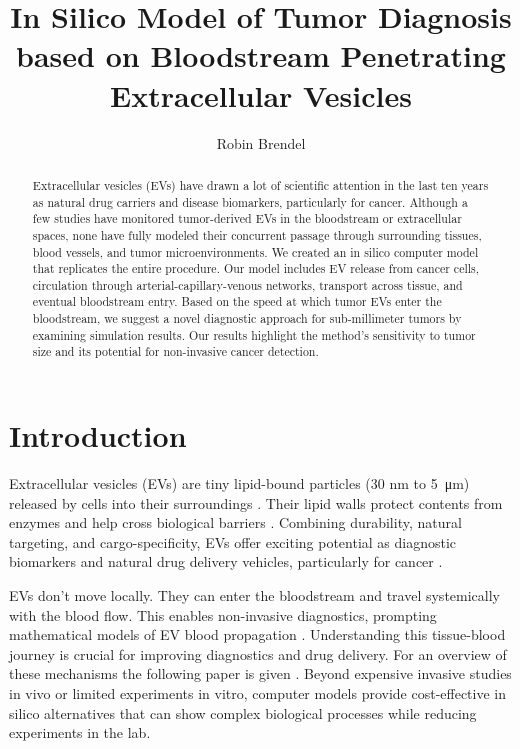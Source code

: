\documentclass[sigconf]{acmart}
\begin{document}
\title{In Silico Model of Tumor Diagnosis based on Bloodstream Penetrating Extracellular Vesicles}
\author{Robin Brendel}

\begin{abstract}
Extracellular vesicles (EVs) have drawn a lot of scientific attention in the last ten years as natural drug carriers and disease biomarkers, particularly for cancer. Although a few studies have monitored tumor-derived EVs in the bloodstream or extracellular spaces, none have fully modeled their concurrent passage through surrounding tissues, blood vessels, and tumor microenvironments. We created an in silico computer model that replicates the entire procedure. Our model includes EV release from cancer cells, circulation through arterial-capillary-venous networks, transport across tissue, and eventual bloodstream entry. Based on the speed at which tumor EVs enter the bloodstream, we suggest a novel diagnostic approach for sub-millimeter tumors by examining simulation results. Our results highlight the method's sensitivity to tumor size and its potential for non-invasive cancer detection. 
\end{abstract}


\maketitle

\section{Introduction}
\label{sec: introduction}
Extracellular vesicles (EVs) are tiny lipid-bound particles (30 nm to \SI{5}{\micro\meter}) released by cells into their surroundings \cite{Doyle_2019}. Their lipid walls protect contents from enzymes and help cross biological barriers \cite{Arjmandi_2021}. Combining durability, natural targeting, and cargo-specificity, EVs offer exciting potential as diagnostic biomarkers and natural drug delivery vehicles, particularly for cancer \cite{Doyle_2019}.

EVs don't move locally. They can enter the bloodstream and travel systemically with the blood flow. This enables non-invasive diagnostics, prompting mathematical models of EV blood propagation \cite{Ferguson_2020}. Understanding this tissue-blood journey is crucial for improving diagnostics and drug delivery. For an overview of these mechanisms the following paper is given \cite{Sykov__2008}. Beyond expensive invasive studies in vivo or limited experiments in vitro, computer models provide cost-effective in silico alternatives that can show complex biological processes while reducing experiments in the lab. 
\end{document}
